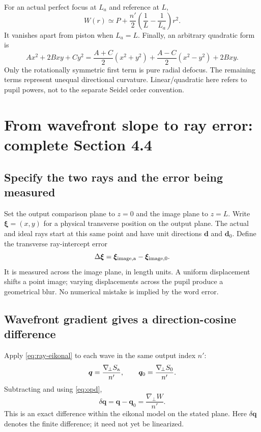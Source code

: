 \documentclass[11pt,a4paper]{article}
\numberwithin{equation}{section}
\newcommand{\gradp}{\nabla_{\!\perp}}
\newcommand{\vct}[1]{\bm{#1}}
\begin{document}
For an actual perfect focus at $L_a$ and reference at $L$,
\[
 W(r)\simeq P+\frac{n'}2\left(\frac1L-\frac1{L_a}\right)r^2.
\]
It vanishes apart from piston when $L_a=L$.
Finally, an arbitrary quadratic form is
\[
 A x^2+2Bxy+C y^2
 =\frac{A+C}{2}(x^2+y^2)
 +\frac{A-C}{2}(x^2-y^2)+2Bxy.
\]
Only the rotationally symmetric first term is pure radial defocus. The
remaining terms represent unequal directional curvature. Linear/quadratic
here refers to pupil powers, not to the separate Seidel order convention.

\section{From wavefront slope to ray error: complete Section 4.4}
\label{sec:rayerror}
\subsection{Specify the two rays and the error being measured}
Set the output comparison plane to $z=0$ and the image plane to $z=L$.
Write $\vct\xi=(x,y)$ for a physical transverse position on the output
plane. The actual and ideal rays start at this same point and have unit
directions $\vct d$ and $\vct d_0$.
Define the transverse ray-intercept error
\begin{equation}
 \Delta\vct\xi=\vct\xi_{\rm image,a}-\vct\xi_{\rm image,0}.
\end{equation}
It is measured across the image plane, in length units. A uniform
displacement shifts a point image; varying displacements across the pupil
produce a geometrical blur. No numerical mistake is implied by the word
error.

\subsection{Wavefront gradient gives a direction-cosine difference}
Apply \eqref{eq:ray-eikonal} to each wave in the same output index $n'$:
\[
 \vct q=\frac{\gradp S_{\rm a}}{n'},\qquad
 \vct q_0=\frac{\gradp S_0}{n'}.
\]
Subtracting and using \eqref{eq:opd},
\begin{equation}
 \boxed{
 \delta\vct q=\vct q-\vct q_0=\frac{\gradp W}{n'}.
 }
 \label{eq:dq}
\end{equation}
This is an exact difference within the eikonal model on the stated plane.
Here $\delta\vct q$ denotes the finite difference; it need not yet be
linearized.
\end{document}
